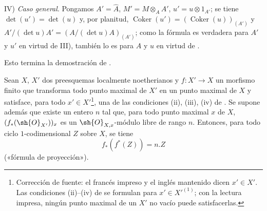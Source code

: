 IV) \emph{Caso general}.
Pongamos $A'=\widehat{A}$, $M'=M\otimes_AA'$, $u'=u\otimes1_{A'}$;
se tiene $\det(u')=\det(u)$ y, por planitud, $\operatorname{Coker}(u')=(\operatorname{Coker}(u))_{(A')}$ y $A'/(\det u)A'=(A/(\det u)A)_{(A')}$;
como la fórmula  es verdadera para $A'$ y $u'$ en virtud de III), también lo es para $A$ y $u$ en virtud de .

Esto termina la demostración de .

\begin{proposition}[21.10.18]
\label{IV.21.10.18}
Sean $X$, $X'$ dos preesquemas localmente noetherianos y $f:X'\to X$ un morfismo finito que transforma todo punto maximal de $X'$ en un punto maximal de $X$ y satisface, para todo $x'\in X'$\footnote{Corrección de fuente: el francés impreso y el inglés mantenido dicen $x'\in X'$. Las condiciones (ii)--(iv) de  se formulan para $x'\in X'^{(1)}$; con la lectura impresa, ningún punto maximal de un $X'$ no vacío puede satisfacerlas.}, una de las condiciones \textup{(ii), (iii), (iv)} de .
Se supone además que existe un entero $n$ tal que, para todo punto maximal $x$ de $X$, $(f_*(\sh{O}_{X'}))_x$ es un $\sh{O}_{X,x}$-módulo libre de rango $n$.
Entonces, para todo ciclo $1$-codimensional $Z$ sobre $X$, se tiene
\[
\label{IV.21.10.18.1}
  f_*(f^*(Z))=n.Z
  \tag{21.10.18.1}
\]
\textup{(«fórmula de proyección»)}.
\end{proposition}

